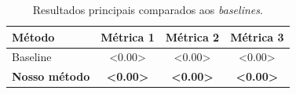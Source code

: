 \begin{table}[H]
  \centering
  \caption{Resultados principais comparados aos \textit{baselines}.}
  \label{tab:resultados}
  \small
  \begin{tabular}{lccc}
    \toprule
    \textbf{M\'etodo} & \textbf{M\'etrica 1} & \textbf{M\'etrica 2} & \textbf{M\'etrica 3} \\
    \midrule
    Baseline           & <0.00> & <0.00> & <0.00> \\
    \textbf{Nosso m\'etodo} & \textbf{<0.00>} & \textbf{<0.00>} & \textbf{<0.00>} \\
    \bottomrule
  \end{tabular}
\end{table}
